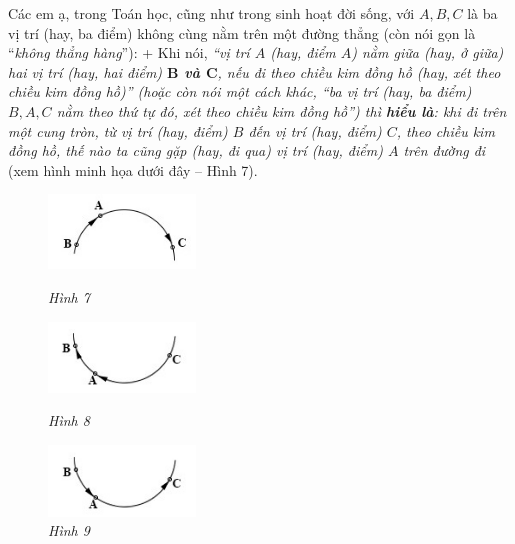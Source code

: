 	\vskip 0.15cm
	Các em ạ, trong Toán học, cũng như trong sinh hoạt đời sống, với $A, B, C$ là ba vị trí (hay, ba điểm) không cùng nằm trên một đường thẳng (còn nói gọn là “\textit{không thẳng hàng}”):
	\vskip 0.15cm
	+ Khi nói, \textit{“vị trí $A$ (\textnormal{hay}, điểm $A$) nằm giữa (\textnormal{hay}, ở giữa) hai vị trí (\textnormal{hay}, hai điểm) \textbf{$\pmb B$ và $\pmb C$}, nếu đi theo chiều kim đồng hồ (\textnormal{hay}, xét theo chiều kim đồng hồ)” (\textnormal{hoặc còn} nói một cách khác, “ba vị trí (\textnormal{hay}, ba điểm) $B, A, C$ nằm theo thứ tự đó, xét theo chiều kim đồng hồ”) thì \textbf{hiểu là}: khi đi trên một cung tròn, từ vị trí (\textnormal{hay}, điểm) $B$ đến vị trí (\textnormal{hay}, điểm) $C$, theo chiều kim đồng hồ, thế nào ta cũng gặp (\textnormal{hay}, đi qua) vị trí (\textnormal{hay}, điểm) $A$ trên đường đi} (xem hình minh họa dưới đây -- Hình 7).
\vskip 0.1cm
		\begin{figure}
		\vspace*{-15pt}
		\centering
		\captionsetup{labelformat=empty, justification=centering}
		\hspace*{-10pt}\includegraphics[width= 0.35\textwidth]{pic7}
		\caption{\textit{\small Hình 7}}
		
		\vspace*{10pt}
		\hspace*{-10pt}\includegraphics[width=0.35\textwidth]{pic8}
		\caption{\small\textit{Hình 8}}
		
		\vspace*{10pt}
		\captionsetup{labelformat=empty, justification=centering}
		\hspace*{-10pt}\includegraphics[width= 0.35\textwidth]{pic9}
		\caption{\textit{\small Hình 9}}
		
		\vspace*{-20pt}
	\end{figure}
